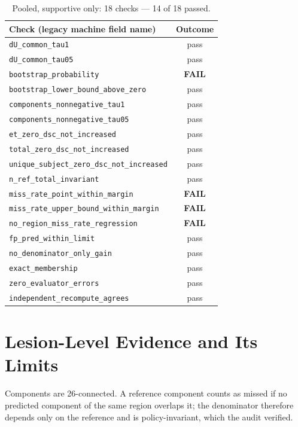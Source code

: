 \documentclass[runningheads]{llncs}
\begin{document}
\begin{table}[htbp]\centering
\caption{Pooled, supportive only: 18 checks --- 14 of 18 passed.}
\begin{tabular}{@{}lc@{}}
\toprule
Check (legacy machine field name) & Outcome \\
\midrule
\texttt{dU\_common\_tau1} & pass \\
\texttt{dU\_common\_tau05} & pass \\
\texttt{bootstrap\_probability} & \textbf{FAIL} \\
\texttt{bootstrap\_lower\_bound\_above\_zero} & pass \\
\texttt{components\_nonnegative\_tau1} & pass \\
\texttt{components\_nonnegative\_tau05} & pass \\
\texttt{et\_zero\_dsc\_not\_increased} & pass \\
\texttt{total\_zero\_dsc\_not\_increased} & pass \\
\texttt{unique\_subject\_zero\_dsc\_not\_increased} & pass \\
\texttt{n\_ref\_total\_invariant} & pass \\
\texttt{miss\_rate\_point\_within\_margin} & \textbf{FAIL} \\
\texttt{miss\_rate\_upper\_bound\_within\_margin} & \textbf{FAIL} \\
\texttt{no\_region\_miss\_rate\_regression} & \textbf{FAIL} \\
\texttt{fp\_pred\_within\_limit} & pass \\
\texttt{no\_denominator\_only\_gain} & pass \\
\texttt{exact\_membership} & pass \\
\texttt{zero\_evaluator\_errors} & pass \\
\texttt{independent\_recompute\_agrees} & pass \\
\bottomrule
\end{tabular}
\end{table}

\section{Lesion-Level Evidence and Its Limits}

Components are 26-connected. A reference component counts as missed if no predicted component of the
same region overlaps it; the denominator therefore depends only on the reference and is
policy-invariant, which the audit verified.
\end{document}
